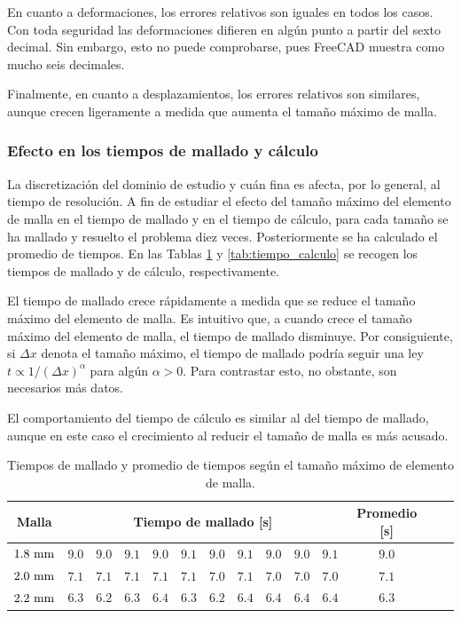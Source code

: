 En cuanto a deformaciones, los errores relativos son iguales en todos los casos. Con toda seguridad las deformaciones difieren en algún punto a partir del sexto decimal. Sin embargo, esto no puede comprobarse, pues FreeCAD muestra como mucho seis decimales.

Finalmente, en cuanto a desplazamientos, los errores relativos son similares, aunque crecen ligeramente a medida que aumenta el tamaño máximo de malla. 

\subsubsection{Efecto en los tiempos de mallado y cálculo}

La discretización del dominio de estudio y cuán fina es afecta, por lo general, al tiempo de resolución. A fin de estudiar el efecto del tamaño máximo del elemento de malla en el tiempo de mallado y en el tiempo de cálculo, para cada tamaño se ha mallado y resuelto el problema diez veces. Posteriormente se ha calculado el promedio de tiempos. En las Tablas \ref{tab:tiempo_mallado} y \ref{tab:tiempo_calculo} se recogen los tiempos de mallado y de cálculo, respectivamente.

El tiempo de mallado crece rápidamente a medida que se reduce el tamaño máximo del elemento de malla. Es intuitivo que, a cuando crece el tamaño máximo del elemento de malla, el tiempo de mallado disminuye. Por consiguiente, si $\Delta x$ denota el tamaño máximo, el tiempo de mallado podría seguir una ley $t \propto 1 / {(\Delta x)}^\alpha$ para algún $\alpha > 0$. Para contrastar esto, no obstante, son necesarios más datos.

El comportamiento del tiempo de cálculo es similar al del tiempo de mallado, aunque en este caso el crecimiento al reducir el tamaño de malla es más acusado. 

\begin{table}[t]
    \centering
    \begin{tabular}{cccccccccccccc}
        \toprule[0.50mm]
        \textbf{Malla} & 
        \multicolumn{10}{c}{\textbf{Tiempo de mallado [s]}} & 
        \textbf{Promedio [s]} \\
        \midrule[0.25mm]
        $1.8 \ \milli\meter$ &
        $9.0$ & $9.0$ & $9.1$ & $9.0$ & $9.1$ & $9.0$ & $9.1$ & $9.0$ & 
        $9.0$ & $9.1$ & $9.0$ \\
        $2.0 \ \milli\meter$ & 
        $7.1$ & $7.1$ & $7.1$ & $7.1$ & $7.1$ & $7.0$ & $7.1$ & $7.0$ & 
        $7.0$ & $7.0$ & $7.1$ \\
        $2.2 \ \milli\meter$ & 
        $6.3$ & $6.2$ & $6.3$ & $6.4$ & $6.3$ & $6.2$ & $6.4$ & $6.4$ & 
        $6.4$ & $6.4$ & $6.3$ \\
        \bottomrule[0.50mm]
    \end{tabular}
    \caption{Tiempos de mallado y promedio de tiempos según el tamaño máximo de elemento de malla.}
    \label{tab:tiempo_mallado}
\end{table}

